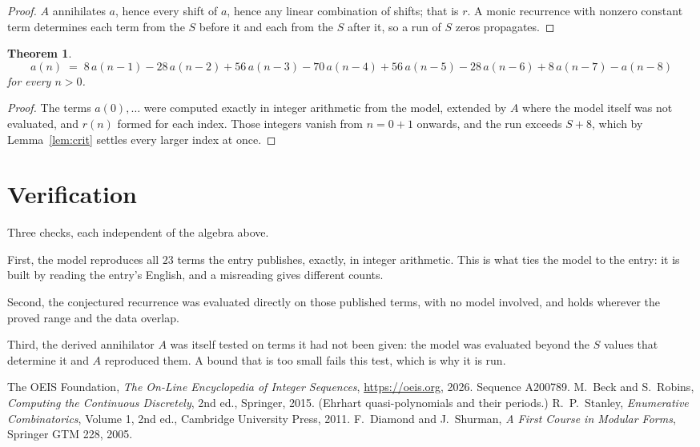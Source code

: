 \documentclass[11pt,a4paper]{article}
\theoremstyle{plain}
\newtheorem{theorem}{Theorem}
\theoremstyle{definition}
\begin{document}
\begin{proof}
$A$ annihilates $a$, hence every shift of $a$, hence any linear combination of shifts; that is
$r$. A monic recurrence with nonzero constant term determines each term from the $S$ before it
and each from the $S$ after it, so a run of $S$ zeros propagates.
\end{proof}

\begin{theorem}
\[
a(n)\;=\;8\,a(n-1) - 28\,a(n-2) + 56\,a(n-3) - 70\,a(n-4) + 56\,a(n-5) - 28\,a(n-6) + 8\,a(n-7) - a(n-8)
\]
for every $n>0$.
\end{theorem}

\begin{proof}
The terms $a(0),\dots$ were computed exactly in integer arithmetic from the model, extended by
$A$ where the model itself was not evaluated, and $r(n)$ formed for each index. Those integers
vanish from $n=0+1$ onwards, and the run exceeds $S+8$, which by
Lemma~\ref{lem:crit} settles every larger index at once.
\end{proof}

\section{Verification}

Three checks, each independent of the algebra above.

First, the model reproduces all $23$ terms the entry publishes, exactly, in integer
arithmetic. This is what ties the model to the entry: it is built by reading the entry's
English, and a misreading gives different counts.

Second, the conjectured recurrence was evaluated directly on those published terms, with no
model involved, and holds wherever the proved range and the data overlap.

Third, the derived annihilator $A$ was itself tested on terms it had not been given: the model
was evaluated beyond the $S$ values that determine it and $A$ reproduced them. A bound that is
too small fails this test, which is why it is run.

\begin{thebibliography}{9}
 The OEIS Foundation, \emph{The On-Line Encyclopedia of Integer
Sequences}, \url{https://oeis.org}, 2026. Sequence A200789.
 M.~Beck and S.~Robins, \emph{Computing the Continuous Discretely},
2nd ed., Springer, 2015. (Ehrhart quasi-polynomials and their periods.)
 R.~P.~Stanley, \emph{Enumerative Combinatorics}, Volume 1, 2nd ed.,
Cambridge University Press, 2011.
 F.~Diamond and J.~Shurman, \emph{A First Course in Modular Forms},
Springer GTM 228, 2005.
\end{thebibliography}
\end{document}
